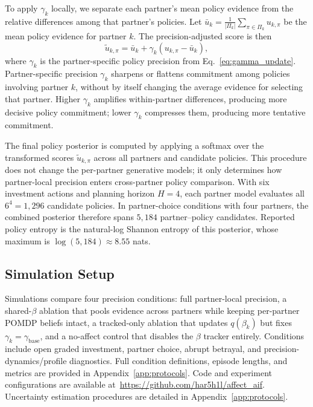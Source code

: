 \documentclass[runningheads,orivec]{llncs}
\newcommand{\githubrepourl}{\url{https://github.com/har5h1l/affect_aif}}
\begin{document}
To apply \(\gamma_k\) locally, we separate each partner's mean policy evidence from the relative differences among that partner's policies. Let \(\bar{u}_k = \frac{1}{|\Pi_k|}\sum_{\pi\in\Pi_k} u_{k,\pi}\) be the mean policy evidence for partner $k$. The precision-adjusted score is then
\begin{equation}
\tilde{u}_{k,\pi} = \bar{u}_k + \gamma_k\left(u_{k,\pi} - \bar{u}_k\right),
\label{eq:centered_policy_scores}
\end{equation}
where $\gamma_k$ is the partner-specific policy precision from Eq.~\eqref{eq:gamma_update}. Partner-specific precision \(\gamma_k\) sharpens or flattens commitment among policies involving partner \(k\), without by itself changing the average evidence for selecting that partner. Higher \(\gamma_k\) amplifies within-partner differences, producing more decisive policy commitment; lower \(\gamma_k\) compresses them, producing more tentative commitment.

The final policy posterior is computed by applying a softmax over the transformed scores \(\tilde{u}_{k,\pi}\) across all partners and candidate policies. This procedure does not change the per-partner generative models; it only determines how partner-local precision enters cross-partner policy comparison. With six investment actions and planning horizon \(H=4\), each partner model evaluates all \(6^4=1{,}296\) candidate policies. In partner-choice conditions with four partners, the combined posterior therefore spans \(5{,}184\) partner--policy candidates. Reported policy entropy is the natural-log Shannon entropy of this posterior, whose maximum is \(\log(5{,}184)\approx8.55\) nats.

\subsection{Simulation Setup}
\label{sec:simulation_setup}

Simulations compare four precision conditions: full partner-local precision, a shared-$\beta$ ablation that pools evidence across partners while keeping per-partner POMDP beliefs intact, a tracked-only ablation that updates $q(\beta_k)$ but fixes $\gamma_k = \gamma_{\text{base}}$, and a no-affect control that disables the $\beta$ tracker entirely. Conditions include open graded investment, partner choice, abrupt betrayal, and precision-dynamics/profile diagnostics. Full condition definitions, episode lengths, and metrics are provided in Appendix~\ref{app:protocols}. Code and experiment configurations are available at~\githubrepourl. Uncertainty estimation procedures are detailed in Appendix~\ref{app:protocols}.
\end{document}
